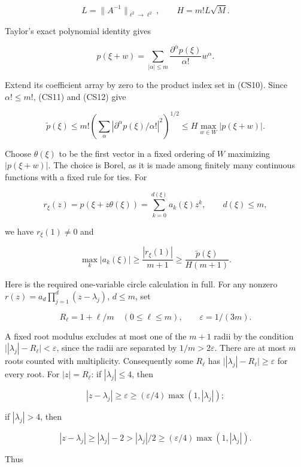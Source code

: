 \documentclass[
  11pt,
]{article}
\begin{document}
\[
 L=\|A^{-1}\|_{\ell^2\to\ell^2},\qquad H=m!L\sqrt M.          \tag{CS11}
\]

Taylor's exact polynomial identity gives

\[
 p(\xi+w)=\sum_{|\alpha|\leq m}
                  \frac{\partial^\alpha p(\xi)}{\alpha!}w^\alpha.
                                                                    \tag{CS12}
\]

Extend its coefficient array by zero to the product index set in (CS10).
Since \(\alpha!\leq m!\), (CS11) and (CS12) give

\[
 \widetilde p(\xi)
 \leq m!\left(\sum_\alpha
                |\partial^\alpha p(\xi)/\alpha!|^2\right)^{1/2}
 \leq H\max_{w\in W}|p(\xi+w)|.                               \tag{CS13}
\]

Choose \(\theta(\xi)\) to be the first vector in a fixed ordering of
\(W\) maximizing \(|p(\xi+w)|\). The choice is Borel, as it is made
among finitely many continuous functions with a fixed rule for ties. For

\[
 r_\xi(z)=p(\xi+z\theta(\xi))=\sum_{k=0}^{d(\xi)}a_k(\xi)z^k,
 \qquad d(\xi)\leq m,
\]

we have \(r_\xi(1)\neq0\) and

\[
 \max_k|a_k(\xi)|
       \geq\frac{|r_\xi(1)|}{m+1}
       \geq\frac{\widetilde p(\xi)}{H(m+1)}.                    \tag{CS14}
\]

Here is the required one-variable circle calculation in full. For any
nonzero \(r(z)=a_d\prod_{j=1}^d(z-\lambda_j)\), \(d\leq m\), set

\[
 R_\ell=1+\ell/m\quad(0\leq\ell\leq m),\qquad
 \varepsilon=1/(3m).                                         \tag{CS15}
\]

A fixed root modulus excludes at most one of the \(m+1\) radii by the
condition \(\big||\lambda_j|-R_\ell\big|<\varepsilon\), since the radii
are separated by \(1/m>2\varepsilon\). There are at most \(m\) roots
counted with multiplicity. Consequently some \(R_\ell\) has
\(\big||\lambda_j|-R_\ell\big|\geq\varepsilon\) for every root. For
\(|z|=R_\ell\): if \(|\lambda_j|\leq4\), then

\[
 |z-\lambda_j|\geq\varepsilon
             \geq(\varepsilon/4)\max(1,|\lambda_j|);
\]

if \(|\lambda_j|>4\), then

\[
 |z-\lambda_j|\geq|\lambda_j|-2
             >|\lambda_j|/2
             \geq(\varepsilon/4)\max(1,|\lambda_j|).
\]

Thus
\end{document}
